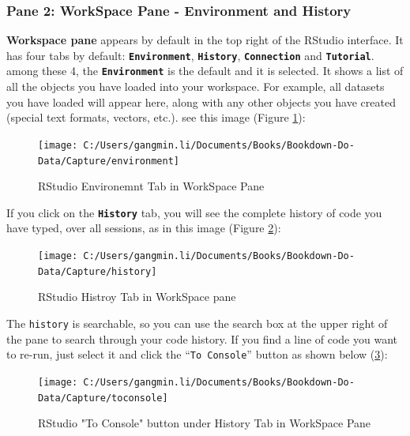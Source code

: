 \documentclass[
]{book}
\begin{document}
\hypertarget{pane-2-workspace-pane---environment-and-history}{%
\subsubsection*{Pane 2: WorkSpace Pane - Environment and History}\label{pane-2-workspace-pane---environment-and-history}}


\textbf{Workspace pane} appears by default in the top right of the RStudio interface. It has four tabs by default: \textbf{\texttt{Environment}}, \textbf{\texttt{History}}, \textbf{\texttt{Connection}} and \textbf{\texttt{Tutorial}}. among these 4, the \textbf{\texttt{Environment}} is the default and it is selected. It shows a list of all the objects you have loaded into your workspace. For example, all datasets you have loaded will appear here, along with any other objects you have created (special text formats, vectors, etc.). see this image (Figure \ref{fig:RStudioEven}):

\begin{figure}

{\centering \texttt{[image: C:/Users/gangmin.li/Documents/Books/Bookdown-Do-Data/Capture/environment]} 

}

\caption{RStudio Environemnt Tab in WorkSpace Pane}\label{fig:RStudioEven}
\end{figure}

If you click on the \textbf{\texttt{History}} tab, you will see the complete history of code you have typed, over all sessions, as in this image (Figure \ref{fig:RStudiohist}):

\begin{figure}

{\centering \texttt{[image: C:/Users/gangmin.li/Documents/Books/Bookdown-Do-Data/Capture/history]} 

}

\caption{RStudio Histroy Tab in WorkSpace pane}\label{fig:RStudiohist}
\end{figure}

The \texttt{history} is searchable, so you can use the search box at the upper right of the pane to search through your code history. If you find a line of code you want to re-run, just select it and click the ``\texttt{To\ Console}'' button as shown below (\ref{fig:RStoconsole}):

\begin{figure}

{\centering \texttt{[image: C:/Users/gangmin.li/Documents/Books/Bookdown-Do-Data/Capture/toconsole]} 

}

\caption{RStudio "To Console" button under History Tab in WorkSpace Pane}\label{fig:RStoconsole}
\end{figure}
\end{document}
